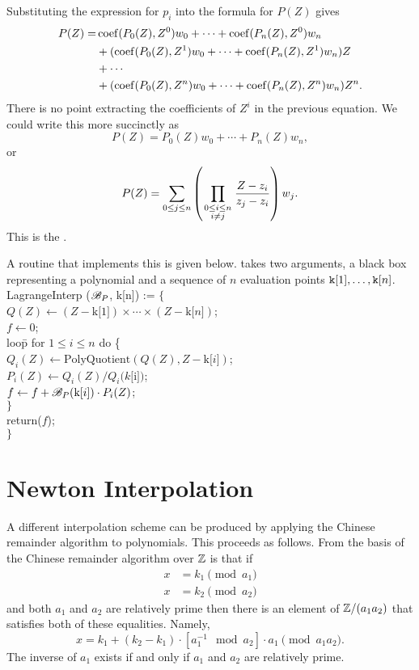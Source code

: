 Substituting the expression for $p_i$ into the formula for $P(Z)$
gives
\[
\begin{aligned}
P(Z) = &\mathop{\rm coef}\nolimits(P_0(Z), Z^{0}) w_0 + \cdots + \mathop{\rm coef}\nolimits(P_n(Z), Z^{0}) w_n \\
 & + (\mathop{\rm coef}\nolimits(P_0(Z), Z^{1}) w_0 + \cdots + \mathop{\rm coef}\nolimits(P_n(Z), Z^{1}) w_n) Z \\
 & + \cdots \\
 & + (\mathop{\rm coef}\nolimits(P_0(Z), Z^{n}) w_0 + \cdots + \mathop{\rm coef}\nolimits(P_n(Z), Z^{n}) w_n) Z^n.
\end{aligned}
\]
There is no point extracting the coefficients
of $Z^i$ in the previous equation.  We could write this more succinctly
as
\[
P(Z) = P_0(Z) w_0 + \cdots + P_n(Z) w_n,
\]
or
\[
P(Z) = \sum_{0\le j\le n} \left({\prod_{\scriptstyle 0\le i\le n\atop 
\scriptstyle i\not=j}
{Z - z_i \over z_j - z_i}}\right) w_j.
\]
This is the .

A routine that implements this is given below.
 takes two arguments, a black box representing a
polynomial and a sequence of $n$ evaluation points ${\tt k}[1], \ldots,
{\tt k}[n]$.
\begindsacode
LagrangeInterp (${\cal B}_P$, k[n]) := $\{$ \\
\> $Q(Z) \leftarrow   (Z - \mbox{k[$1$]})\times \cdots \times (Z - \mbox{k[$n$]})$; \\
\> $f \leftarrow 0$; \\
\> loo\=p for $1 \le i \le n$ do \{ \\
\>\> $Q_i(Z) \leftarrow \mbox{PolyQuotient}(Q(Z), Z - \mbox{k[$i$]})$; \\
\>\> $P_i(Z) \leftarrow Q_i(Z)/Q_i(k[$i$])$; \\
\>\> $f \leftarrow f + {\cal B}_P(\mbox{k[$i$]}) \cdot P_i(Z)$; \\
\>\> $\}$ \\
\> return($f$); \\
\> $\}$
\enddsacode

\section{Newton Interpolation}
\label{Interp:CRA:Sec}

A different interpolation scheme can be produced by applying the
Chinese remainder algorithm to
polynomials.  This proceeds as follows.  From
 the basis of the Chinese 
remainder algorithm over $\mathbb{Z}$ is that if
\[
\begin{aligned}
  x &= k_1 \pmod{a_1}\\
  x &= k_2 \pmod{a_2}
\end{aligned}
\]
and both $a_1$ and $a_2$ are relatively prime then there is an element of 
$\mathbb{Z}/(a_1 a_2)$ that satisfies both of these equalities.  Namely,
\begin{equation}
x = k_1 +  (k_2 - k_1) \cdot \left[a_1^{-1} \mod{a_2}\right]\cdot a_1 
   \pmod {a_1 a_2}.
\label{Chinese:Remainder:Alg:Eq}
\end{equation}
The inverse of $a_1$ exists if and only if $a_1$
and $a_2$ are relatively prime. 


